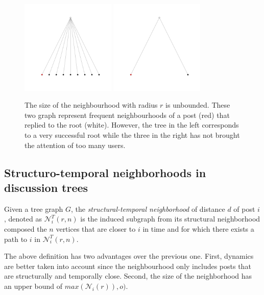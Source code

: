 \documentclass[smallextended]{svjour3}          %
\begin{document}
\begin{figure}
	\centering
	\includegraphics[width=0.4\textwidth]{large_neighborhood}
	\includegraphics[width=0.4\textwidth]{small_neighborhood}
	\caption{The size of the neighbourhood with radius $r$ is unbounded. These two graph represent frequent neighbourhoods of a post (red) that replied to the root (white). However, the tree in the left corresponds to a very successful root while the three in the right has not brought the attention of too many users.}
	\label{fig:large_neighbourhood}
\end{figure}


\subsection{Structuro-temporal neighborhoods in discussion trees}
\begin{definition}
Given a tree graph $G$, the \textit{structural-temporal neighborhood} of distance $d$ of post $i$, denoted as $\mathcal{N}_{i}^T(r,n)$ is the induced subgraph from its structural neighborhood composed the $n$ vertices that are closer to $i$ in time and for which there exists a path to $i$ in $\mathcal{N}_{i}^T(r,n)$.  
\end{definition}

The above definition has two advantages over the previous one. First, dynamics are better taken into account since the neighbourhood only includes posts that are structurally and temporally close. Second, the size of the neighborhood has an upper bound of $max(\mathcal{N}_i(r)), o)$.
\end{document}

